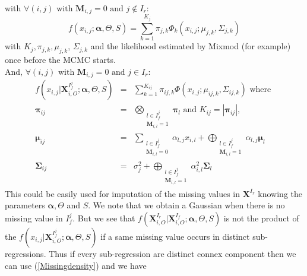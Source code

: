 \documentclass[12pt,a4paper]{report}
\begin{document}
with	  $\forall (i,j) \textrm{ with } \boldsymbol{M}_{i,j}= 0 \textrm{ and } j \notin I_r $:
	 \begin{equation}
	 f(x_{i,j};\boldsymbol{\alpha},\Theta,S)=\sum_{k=1}^{K_j}\pi_{j,k}\Phi_k(x_{i,j};\mu_{j,k},\Sigma_{j,k}) \label{likmissdroite}
	 \end{equation} with $K_j,\pi_{j,k}, \mu_{j,k}$, $\Sigma_{j,k}$ and the likelihood estimated by Mixmod (for example) once before the MCMC starts. 
\\
	 And, $\forall (i,j) \textrm{ with } \boldsymbol{M}_{i,j}= 0 \textrm{ and } j \in I_r $:
		\begin{eqnarray}
 f(x_{i,j}|\boldsymbol{X}_{i,O}^{I_f^j};\boldsymbol{\alpha},\Theta,S)&=& \sum_{k=1}^{K_{ij}}\pi_{ij,k}\Phi(x_{i,j};\mu_{ij,k},\Sigma_{ij,k}) \textrm{ where }  \label{Missingdensity}\\
				\boldsymbol{\pi}_{ij} &=& \bigotimes_{\substack{l \in I_f^j \\ \boldsymbol{M}_{i,l}=1 } } \boldsymbol{\pi}_l \textrm{ and  }K_{ij}=|\boldsymbol{\pi}_{ij}| ,\\
				\boldsymbol{\mu}_{ij}&=& \sum_{\substack{l \in I_f^j \\ \boldsymbol{M}_{i,l}=0  }}\alpha_{l,j}x_{i,l} + \bigoplus_{\substack{l \in I_f^j \\ \boldsymbol{M}_{i,l}=1  }} \alpha_{l,j} \boldsymbol{\mu}_l \\
				\boldsymbol{\Sigma}_{ij} &=& \sigma_j^2 + \bigoplus_{\substack{l \in I_f^j \\ \boldsymbol{M}_{i,l}=1 }}\alpha_{i,l}^2 \boldsymbol{\Sigma}_l		
		\end{eqnarray}		 
		This could be easily used for imputation of the missing values in $\boldsymbol{X}^{I_r}$ knowing the parameters $\boldsymbol{\alpha}, \Theta$ and $S$. We note that we obtain a Gaussian when there is no missing value in $I_f^j$.
		But we see that	$f(\boldsymbol{X}^{I_r}_{i,O}|\boldsymbol{X}^{I_f}_{i,O};\boldsymbol{\alpha},\Theta,S)$ is not the product of the $f(x_{i,j}|\boldsymbol{X}_{i,O}^{I_f^j};\boldsymbol{\alpha},\Theta,S) $	if a same missing value occurs in distinct sub-regressions. Thus if every sub-regression are distinct connex component then we can use (\ref{Missingdensity}) and we have
\end{document}
